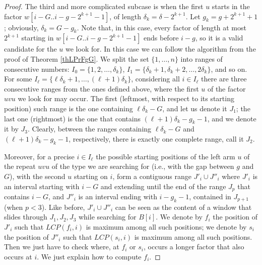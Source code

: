 \documentclass[final]{dmtcs-episciences}
\begin{document}
\begin{proof}
The third and more complicated subcase is when the first $u$ starts in the factor $w[i-G..i-g-2^{k+1}-1]$, of length $\delta_k=\delta-2^{k+1}$. Let $g_k=g+2^{k+1}+1$; obviously, $\delta_k=G-g_k$. Note that, in this case, every factor of length at most $2^{k+1}$ starting in $w[i-G..i-g-2^{k+1}-1]$ ends before $i-g$, so it is a valid candidate for the $u$ we look for.
In this case we can follow the algorithm from the proof of Theorem \ref{thLPrFgG}. We split the set $\{1,\ldots,n\}$ into ranges of consecutive numbers: $I_0=\{1,2,\ldots,\delta_k\}$, $I_1=\{\delta_k+1, \delta_k+2,\ldots, 2\delta_k\}$, and so on. For some $ I_\ell=\{\ell\delta_k+1,\ldots,(\ell+1)\delta_k\}$, considering all $i\in I_\ell$ there are three consecutive ranges from the ones defined above, where the first $u$ of the factor $uvu$ we look for may occur. The first (leftmost, with respect to its starting position) such range is the one containing $\ell\delta_k-G$, and let us denote it $J_1$; the last one (rightmost) is the one that contains $(\ell+1)\delta_k-g_k-1$, and we denote it by $J_3$. Clearly, between the ranges containing $\ell\delta_k-G$ and $(\ell+1)\delta_k-g_k-1$, respectively, there is exactly one complete range, call it $J_2$. 

Moreover, for a precise $i\in I_\ell$ the possible starting positions of the left arm $u$ of the repeat $uvu$ of the type we are searching for (i.e., with the gap between $g$ and $G$), with the second $u$ starting on $i$, form a contiguous range $J'_i\cup J''_i$ where $J'_i$ is an interval starting with $i-G$ and extending until the end of the range $J_p$ that contains $i-G$, and $J''_i$ is an interval ending with $i-g_k-1$, contained in $J_{p+1}$ (when $p<3$). Like before, $J'_i\cup J''_i$ can be seen as the content of a window that slides through $J_1,J_2,J_3$ while searching for $B[i]$. We denote by $f_i$ the position of $J'_i$ such that $LCP(f_i,i)$ is maximum among all such positions; we denote by $s_i$ the position of $J''_i$ such that $LCP(s_i,i)$ is maximum among all such positions. Then we just have to check where, at $f_i$ or $s_i$, occurs a longer factor that also occurs at $i$. We just explain how to compute $f_i$. 


\end{proof}
\end{document}
